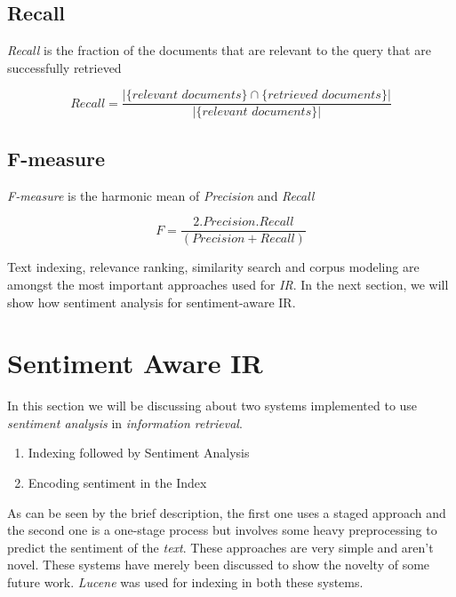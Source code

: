 \subsection*{Recall}

\textit{Recall} is the fraction of the documents that are relevant to the query that are successfully retrieved

\begin{equation}
 Recall = \frac{|\{\textit{relevant documents}\} \cap \{\textit{retrieved documents}\}|}{|\{\textit{relevant documents}\}|}
\end{equation}

\subsection*{F-measure}

\textit{F-measure} is the harmonic mean of \textit{Precision} and \textit{Recall}

\begin{equation}
 F = \frac{2.Precision.Recall}{(Precision+Recall)}
\end{equation}

\par

Text indexing, relevance ranking, similarity search and corpus modeling are amongst the most important approaches used for 
\textit{IR}. In the next section, we will show how sentiment analysis for sentiment-aware IR.

\section{Sentiment Aware IR}

In this section we will be discussing about two systems implemented to use \textit{sentiment analysis} in \textit{information retrieval}.

\begin{enumerate}
 \item Indexing followed by Sentiment Analysis
 \item Encoding sentiment in the Index
\end{enumerate}

As can be seen by the brief description, the first one uses a staged approach and the second one is a one-stage process but involves
some heavy preprocessing to predict the sentiment of the \textit{text}. These approaches are very simple and aren't novel.
These systems have merely been discussed to show the novelty of some future work. \textit{Lucene} \citep*{apachelucene} was used for indexing
in both these systems.

